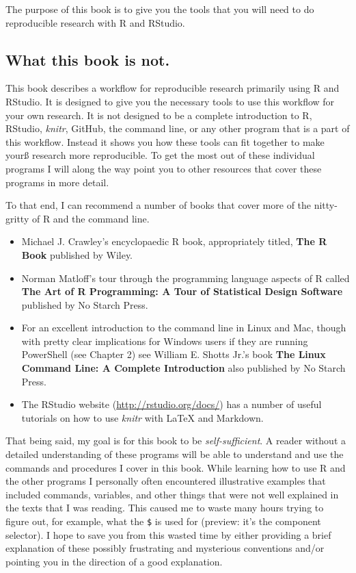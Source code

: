 The purpose of this book is to give you the tools that you will need to do reproducible research with R and RStudio. 

\subsection{What this book is not.}\label{WhatNot}

This book describes a workflow for reproducible research primarily using R and RStudio. It is designed to give you the necessary tools to use this workflow for your own research. It is not designed to be a complete introduction to R, RStudio, {\emph{knitr}}, GitHub, the command line, or any other program that is a part of this workflow. Instead it shows you how these tools can fit together to make yourß research more reproducible. To get the most out of these individual programs I will along the way point you to other resources that cover these programs in more detail.

To that end, I can recommend a number of books that cover more of the nitty-gritty of R and the command line.

\begin{itemize}
    \item Michael J. Crawley's encyclopaedic R book, appropriately titled, \textbf{The R Book} published by Wiley.
    
    \item Norman Matloff's tour through the programming language aspects of  R called \textbf{The Art of R Programming: A Tour of Statistical Design Software} published by No Starch Press.
    
    \item For an excellent introduction to the command line in Linux and Mac, though with pretty clear implications for Windows users if they are running PowerShell (see Chapter 2) see William E. Shotts Jr.'s book \textbf{The Linux Command Line: A Complete Introduction} also published by No Starch Press.
    
    \item The RStudio website (\url{http://rstudio.org/docs/}) has a
  number of useful tutorials on how to use {\emph{knitr}} with LaTeX and Markdown.
\end{itemize}

That being said, my goal is for this book to be {\emph{self-sufficient}}. A reader without a detailed understanding of these programs will be able to understand and use the commands and procedures I cover in this book. While learning how to use R and the other programs I personally often encountered illustrative examples that included commands, variables, and other things that were not well explained in the texts that I was reading. This caused me to waste many hours trying to figure out, for example, what the \texttt{\$} is used for (preview: it's the component selector). I hope to save you from this wasted time by either providing a brief explanation of these possibly frustrating and mysterious conventions and/or pointing you in the direction of a good explanation.

